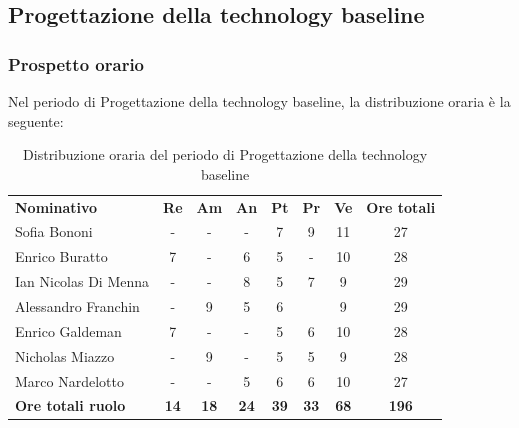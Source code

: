 \documentclass[../piano-di-progetto.tex]{subfiles}
\begin{document}
  \subsection{Progettazione della technology baseline}

  \subsubsection{Prospetto orario}
  Nel periodo di Progettazione della technology baseline, la distribuzione oraria è la seguente:
  \begin{table}[H]
    \centering
    \begin{tabular}{lccccccc}
      \rowcolor{lightgray}
      \textbf{Nominativo}        & \textbf{Re} & \textbf{Am}  & \textbf{An} & \textbf{Pt}  & \textbf{Pr}   & \textbf{Ve} & \textbf{Ore totali} \\
      Sofia Bononi              & -           & -           & -           & 7           & 9           & 11          & 27           \\
      Enrico Buratto            & 7           & -           & 6           & 5           & -           & 10          & 28           \\
      Ian Nicolas Di Menna      & -           & -           & 8           & 5           & 7           & 9           & 29           \\
      Alessandro Franchin       & -           & 9           & 5           & 6           &             & 9           & 29           \\
      Enrico Galdeman           & 7           & -           & -           & 5           & 6           & 10          & 28           \\
      Nicholas Miazzo           & -           & 9           & -           & 5           & 5           & 9           & 28           \\
      Marco Nardelotto          & -           & -           & 5           & 6           & 6           & 10          & 27           \\
      \textbf{Ore totali ruolo} & \textbf{14} & \textbf{18} & \textbf{24} & \textbf{39} & \textbf{33} & \textbf{68} & \textbf{196}
    \end{tabular}
    \caption{Distribuzione oraria del periodo di Progettazione della technology baseline}
  \end{table}
\end{document}
